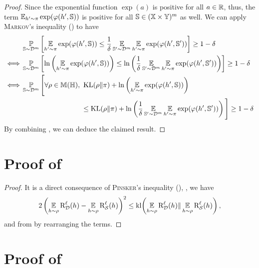 \begin{noaddcontents}
\begin{proof}
Since the exponential function $\exp(a)$ is positive for all $a\in\mathbb{R}$, thus, the term $\operatorname*{\mathbb{E}}_{h'\sim\pi}\exp(\varphi(h', \mathbb{S}))$ is positive for all $\mathbb{S}\in(\mathbb{X}\times\mathbb{Y})^m$ as well.
We can apply \textsc{Markov}'s inequality () to have
\begin{align}
    &\PP_{\S\sim\D^\m}\LB\EE_{\h'\sim\P}\exp(\varphi(\h', \S)) \le \frac{1}{\delta}\EE_{\S'\sim\D^\m}\EE_{\h'\sim\P}\exp(\varphi(\h', \S'))\RB\ge 1-\delta\nonumber\\
    \iff &\PP_{\S\sim\D^\m}\LB\ln\LP\EE_{\h'\sim\P}\exp(\varphi(\h', \S))\RP \le \ln\LP\frac{1}{\delta}\EE_{\S'\sim\D^\m}\EE_{\h'\sim\P}\exp(\varphi(\h', \S'))\RP\RB\ge 1-\delta\nonumber\\
    \iff &\PP_{\S\sim\D^\m}\Bigg[\forall\Q\in\M(\H),\  \KL(\Q\|\P)+\ln\LP\EE_{\h'\sim\P}\exp(\varphi(\h', \S))\RP\nonumber\\
    &\hspace{3cm}\le \KL(\Q\|\P)+\ln\LP\frac{1}{\delta}\EE_{\S'\sim\D^\m}\EE_{\h'\sim\P}\exp(\varphi(\h', \S'))\RP\Bigg]\ge 1-\delta\label{chap:pac-bayes:eq:proof-general-germain-2}
\end{align}
By combining , we can deduce the claimed result.
\end{proof}

\section{Proof of }
\label{ap:pac-bayes:sec:proof-mcallester}

\mcallester*
\begin{proof}
It is a direct consequence of \textsc{Pinsker}'s inequality (), \ie, we have
\begin{align*}
    2\left(\operatorname*{\mathbb{E}}_{h\sim\rho}\text{R}^{\ell}_{\mathcal{D}}(h)-\operatorname*{\mathbb{E}}_{h\sim\rho}\text{R}^{\ell}_{\mathcal{S}}(h)\right)^2 \le \operatorname{kl}\!\left(\operatorname*{\mathbb{E}}_{h\sim\rho}\text{R}^{\ell}_{\mathcal{D}}(h)\|\operatorname*{\mathbb{E}}_{h\sim\rho}\text{R}^{\ell}_{\mathcal{S}}(h)\right),
\end{align*}
and from  by rearranging the terms.
\end{proof}

\section{Proof of }
\label{ap:pac-bayes:sec:proof-catoni}


\end{noaddcontents}
